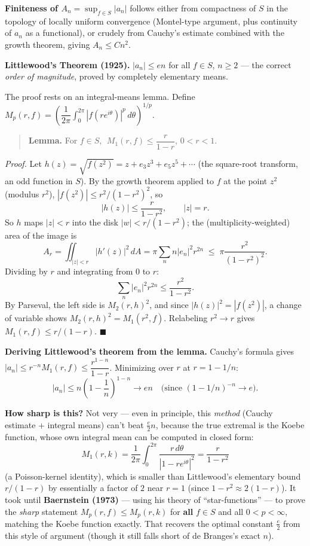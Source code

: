 \documentclass[
]{book}
\theoremstyle{definition}
\theoremstyle{definition}
\theoremstyle{definition}
\theoremstyle{definition}
\theoremstyle{remark}
\begin{document}
\textbf{Finiteness of \(A_n = \sup_{f\in S}|a_n|\)} follows either from compactness of \(S\) in the topology of locally uniform convergence (Montel-type argument, plus continuity of \(a_n\) as a functional), or crudely from Cauchy's estimate combined with the growth theorem, giving \(A_n \le Cn^2\).

\textbf{Littlewood's Theorem (1925).} \(|a_n| \le en\) for all \(f\in S\), \(n\ge2\) --- the correct \emph{order of magnitude}, proved by completely elementary means.

The proof rests on an integral-means lemma. Define \(M_p(r,f) = \left(\dfrac{1}{2\pi}\int_0^{2\pi}|f(re^{i\theta})|^p\,d\theta\right)^{1/p}\).

\begin{quote}
\textbf{Lemma.} For \(f\in S\), \(\;M_1(r,f) \le \dfrac{r}{1-r}\), \(0<r<1\).
\end{quote}

\emph{Proof.} Let \(h(z) = \sqrt{f(z^2)} = z + e_3z^3+e_5z^5+\cdots\) (the square-root transform, an odd function in \(S\)). By the growth theorem applied to \(f\) at the point \(z^2\) (modulus \(r^2\)), \(|f(z^2)| \le r^2/(1-r^2)^2\), so
\[|h(z)| \le \frac{r}{1-r^2}, \qquad |z|=r.\]
So \(h\) maps \(|z|<r\) into the disk \(|w| < r/(1-r^2)\); the (multiplicity-weighted) area of the image is
\[A_r = \iint_{|z|<r} |h'(z)|^2\,dA = \pi\sum_n n|e_n|^2 r^{2n} \;\le\; \pi \frac{r^2}{(1-r^2)^2}.\]
Dividing by \(r\) and integrating from \(0\) to \(r\):
\[\sum_n |e_n|^2 r^{2n} \le \frac{r^2}{1-r^2}.\]
By Parseval, the left side is \(M_2(r,h)^2\), and since \(|h(z)|^2=|f(z^2)|\), a change of variable shows \(M_2(r,h)^2 = M_1(r^2,f)\). Relabeling \(r^2\to r\) gives \(M_1(r,f)\le r/(1-r)\). \(\blacksquare\)

\textbf{Deriving Littlewood's theorem from the lemma.} Cauchy's formula gives \(|a_n| \le r^{-n}M_1(r,f) \le \dfrac{r^{1-n}}{1-r}\). Minimizing over \(r\) at \(r=1-1/n\):
\[|a_n| \le n\left(1-\frac1n\right)^{1-n} \longrightarrow en \quad\text{(since $(1-1/n)^{-n}\to e$).}\]

\textbf{How sharp is this?} Not very --- even in principle, this \emph{method} (Cauchy estimate + integral means) can't beat \(\tfrac e2 n\), because the true extremal is the Koebe function, whose own integral mean can be computed in closed form:
\[M_1(r,k) = \frac{1}{2\pi}\int_0^{2\pi}\frac{r\,d\theta}{|1-re^{i\theta}|^2} = \frac{r}{1-r^2}\]
(a Poisson-kernel identity), which is smaller than Littlewood's elementary bound \(r/(1-r)\) by essentially a factor of \(2\) near \(r=1\) (since \(1-r^2\approx 2(1-r)\)). It took until \textbf{Baernstein (1973)} --- using his theory of ``star-functions'' --- to prove the \emph{sharp} statement \(M_p(r,f)\le M_p(r,k)\) for \textbf{all} \(f\in S\) and all \(0<p<\infty\), matching the Koebe function exactly. That recovers the optimal constant \(\tfrac e2\) from this style of argument (though it still falls short of de Branges's exact \(n\)).
\end{document}
